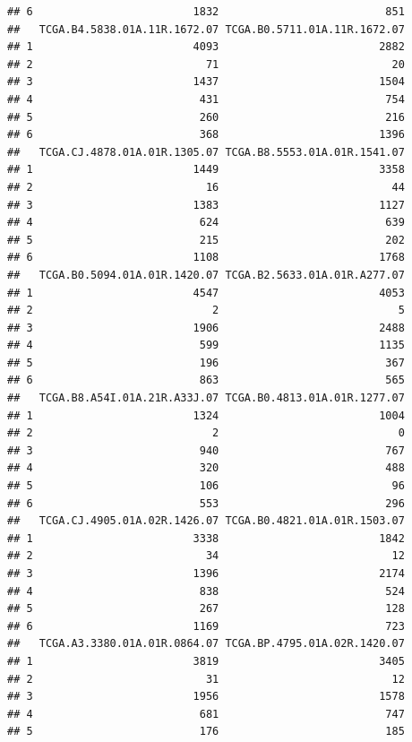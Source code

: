 \documentclass[
]{article}
\begin{document}
\begin{verbatim}
## 6                         1832                          851
##   TCGA.B4.5838.01A.11R.1672.07 TCGA.B0.5711.01A.11R.1672.07
## 1                         4093                         2882
## 2                           71                           20
## 3                         1437                         1504
## 4                          431                          754
## 5                          260                          216
## 6                          368                         1396
##   TCGA.CJ.4878.01A.01R.1305.07 TCGA.B8.5553.01A.01R.1541.07
## 1                         1449                         3358
## 2                           16                           44
## 3                         1383                         1127
## 4                          624                          639
## 5                          215                          202
## 6                         1108                         1768
##   TCGA.B0.5094.01A.01R.1420.07 TCGA.B2.5633.01A.01R.A277.07
## 1                         4547                         4053
## 2                            2                            5
## 3                         1906                         2488
## 4                          599                         1135
## 5                          196                          367
## 6                          863                          565
##   TCGA.B8.A54I.01A.21R.A33J.07 TCGA.B0.4813.01A.01R.1277.07
## 1                         1324                         1004
## 2                            2                            0
## 3                          940                          767
## 4                          320                          488
## 5                          106                           96
## 6                          553                          296
##   TCGA.CJ.4905.01A.02R.1426.07 TCGA.B0.4821.01A.01R.1503.07
## 1                         3338                         1842
## 2                           34                           12
## 3                         1396                         2174
## 4                          838                          524
## 5                          267                          128
## 6                         1169                          723
##   TCGA.A3.3380.01A.01R.0864.07 TCGA.BP.4795.01A.02R.1420.07
## 1                         3819                         3405
## 2                           31                           12
## 3                         1956                         1578
## 4                          681                          747
## 5                          176                          185

\end{verbatim}
\end{document}
